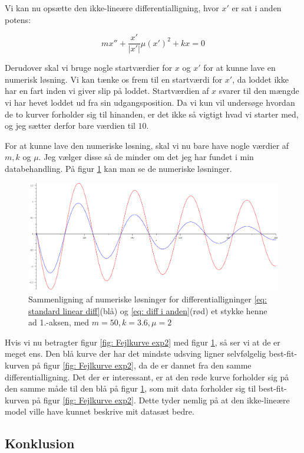 Vi kan nu opsætte den ikke-lineære differentialligning, hvor $x'$ er sat i anden potens:

\begin{equation}
mx'' + \frac{x'}{|x'|} \mu  (x')^2 + kx = 0
\label{eq: diff i anden}
\end{equation}

Derudover skal vi bruge nogle startværdier for $x$ og $x'$ for at kunne lave en numerisk løsning.
Vi kan tænke os frem til en startværdi for $x'$, da loddet ikke har en fart inden vi giver slip på loddet. 
Startværdien af $x$ svarer til den mængde vi har hevet loddet ud fra sin udgangsposition. 
Da vi kun vil undersøge hvordan de to kurver forholder sig til hinanden, er det ikke så vigtigt hvad vi starter med, og jeg sætter derfor bare værdien til $10$.

For at kunne lave den numeriske løsning, skal vi nu bare have nogle værdier af $m,k$ og $\mu$. 
Jeg vælger disse så de minder om det jeg har fundet i min databehandling. 
På figur \ref{fig: numeriske solutions} kan man se de numeriske løsninger. 

\begin{figure}[h]
\centering
\includegraphics[scale=0.5]{Figurer/diffligninger}
\caption{Sammenligning af numeriske løsninger for differentialligninger \ref{eq: standard linear diff}(blå) og \ref{eq: diff i anden}(rød) et stykke henne ad 1.-aksen, med $m=50,k=3.6,\mu=2$}
\label{fig: numeriske solutions}

\end{figure}

Hvis vi nu betragter figur \ref{fig: Fejlkurve exp2} med figur \ref{fig: numeriske solutions}, så ser vi at de er meget ens. 
Den blå kurve der har det mindste udsving ligner selvfølgelig best-fit-kurven på figur \ref{fig: Fejlkurve exp2}, da de er dannet fra den samme differentialligning. 
Det der er interessant, er at den røde kurve forholder sig på den samme måde til den blå på figur \ref{fig: numeriske solutions}, som mit data forholder sig til best-fit-kurven på figur \ref{fig: Fejlkurve exp2}. 
Dette tyder nemlig på at den ikke-lineære model ville have kunnet beskrive mit datasæt bedre. 





\subsection{Konklusion}


